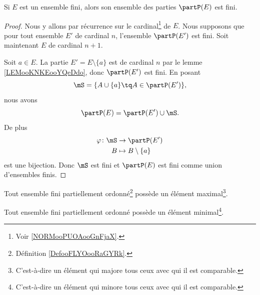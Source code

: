 \begin{lemma}	\label{LEMooNTVKooTfvHfA}
	Si \( E\) est un ensemble fini, alors son ensemble des parties \( \partP(E)\) est fini.
\end{lemma}

\begin{proof}
	Nous y allons par récurrence sur le cardinal\footnote{Voir \ref{NORMooPUOAooGnFjaX}.} de \( E\). Nous supposons que pour tout ensemble \( E'\) de cardinal \( n\), l'ensemble \( \partP(E')\) est fini. Soit maintenant \( E\) de cardinal \( n+1\).

	Soit \( a\in E\). La partie \( E'=E\setminus \{ a \}\) est de cardinal \( n\) par le lemme \ref{LEMooKNKEooYQeDdo}, donc \( \partP(E')\) est fini. En posant
	\begin{equation}
		\mS=\{ A\cup\{ a \}\tq A\in\partP(E') \},
	\end{equation}
	nous avons
	\begin{equation}
		\partP(E)=\partP(E')\cup \mS.
	\end{equation}
	De plus
	\begin{equation}
		\begin{aligned}
			\varphi\colon \mS & \to \partP(E')            \\
			B                 & \mapsto B\setminus\{ a \}
		\end{aligned}
	\end{equation}
	est une bijection. Donc \( \mS\) est fini et \( \partP(E)\) est fini comme union d'ensembles finis.
\end{proof}


\begin{proposition}	\label{PROPooGJLYooTQtlSV}
	Tout ensemble fini partiellement ordonné\footnote{Définition \ref{DefooFLYOooRaGYRk}.} possède un élément maximal\footnote{C'est-à-dire un élément qui majore tous ceux avec qui il est comparable.}.

	Tout ensemble fini partiellement ordonné possède un élément minimal\footnote{C'est-à-dire un élément qui minore tous ceux avec qui il est comparable.}.
\end{proposition}

